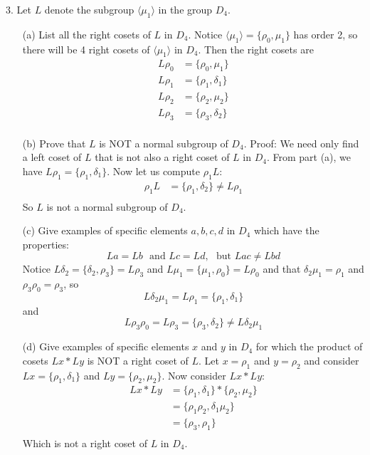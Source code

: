 \documentclass{article}
\begin{document}
3. Let $L$ denote the subgroup $\langle \mu_1 \rangle$ in the group $D_4$.
\begin{enumerate}
    \item[(a)] List all the right cosets of $L$ in $D_4$.
    \newline\newline
    Notice $\langle \mu_1 \rangle = \{\rho_0, \mu_1\}$ has order 2, so there will be 4 right cosets of $\langle \mu_1 \rangle$ in $D_4$. Then the right cosets are
    \begin{align*}
        L\rho_0 &= \{\rho_0, \mu_1\} \\
        L\rho_1 &= \{\rho_1, \delta_1\} \\
        L\rho_2 &= \{\rho_2, \mu_2\} \\
        L\rho_3 & = \{\rho_3, \delta_2\} \\
    \end{align*}
    
    
    \item[(b)] Prove that $L$ is NOT a normal subgroup of $D_4$. 
    \newline\newline
    Proof: We need only find a left coset of $L$ that is not also a right coset of $L$ in $D_4$. From part (a), we have $L\rho_1 = \{\rho_1, \delta_1\}$. Now let us compute $\rho_1L$:
    \begin{align*}
        \rho_1L &= \{\rho_1, \delta_2\} \neq L\rho_1 \\
    \end{align*}
    So $L$ is not a normal subgroup of $D_4$.
    
    
    \item[(c)] Give examples of specific elements $a,b,c,d$ in $D_4$ which have the properties:
    \[La = Lb \:\:\: \text{and  } Lc = Ld, \:\:\: \text{but  } Lac \neq Lbd \]
    \newline\newline
    Notice $L\delta_2 = \{\delta_2, \rho_3\} = L\rho_3$ and $L\mu_1 = \{\mu_1, \rho_0\} = L\rho_0$ and that $\delta_2\mu_1 = \rho_1$ and $\rho_3\rho_0 = \rho_3$, so
    \[L\delta_2\mu_1 = L\rho_1 = \{\rho_1, \delta_1\}\]
    and
    \[L\rho_3\rho_0 = L\rho_3 = \{\rho_3, \delta_2\} \neq L\delta_2\mu_1\]
    
    \item[(d)] Give examples of specific elements $x$ and $y$ in $D_4$ for which the product of cosets $Lx * Ly$ is NOT a right coset of $L$.
    \newline\newline
    Let $x = \rho_1$ and $y = \rho_2$ and consider $Lx = \{\rho_1, \delta_1\}$ and $Ly = \{\rho_2, \mu_2\}$. Now consider $Lx * Ly$:
    \begin{align*}
        Lx * Ly &= \{\rho_1, \delta_1\} * \{\rho_2, \mu_2\} \\
        &= \{\rho_1\rho_2, \delta_1\mu_2\} \\
        &= \{\rho_3, \rho_1\} \\
    \end{align*}
    Which is not a right coset of $L$ in $D_4$.
\end{enumerate}
\end{document}
